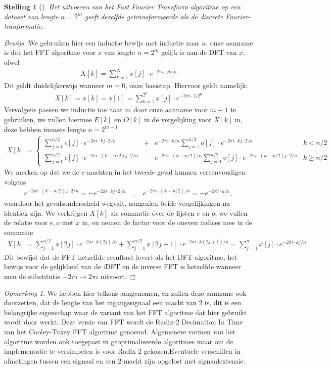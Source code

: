 \documentclass[11pt]{report}
\newcommand{\e}{\epsilon}
\newtheorem*{stelling}{Stelling}
\theoremstyle{remark}
\newtheorem*{opmerk}{Opmerking}
\newcommand{\eq}[1]{\begin{eqnarray*} #1 \end{eqnarray*}}
\begin{document}
\begin{stelling}[]
  Het uitvoeren van het Fast Fourier Transform algoritme op een dataset van lengte $n=2^m$ geeft
  dezelfde getransformeerde als de discrete Fourier-tranformatie.
\end{stelling}
\begin{proof}[Bewijs]
We gebruiken hier een inductie bewijs met inductie naar $n$, onze aanname is dat het FFT algoritme voor $x$ van lengte $n=2^m$ gelijk is aan de DFT van $x$, ofwel
\eq{
  X[k] = \sum^{N}_{k=1} x[j] \cdot e^{-2\pi i \cdot jk/n}
}
Dit geldt duidelijkerwijs wanneer $m=0$, onze basistap. Hiervoor geldt namelijk:
\eq{
  X[k] = x[k] = x[1] = \sum^{2^0}_{k=1} x[j] \cdot e^{-2\pi i \cdot 1/2^0}
}
Vervolgens passen we inductie toe naar $m$ door onze aanname voor $m-1$ te gebruiken,
we vullen hiermee $E[k]$ en $O[k]$ in de vergelijking voor $X[k]$ in, deze hebben immers lengte $n=2^{m-1}$.
\eq{
  X[k] = \left\{\begin{array}{llll}
    \sum^{n/2}_{j=1} \e[j] 
    \cdot e^{-2\pi i \cdot kj \cdot 2/n} &+& 
    e^{-2\pi i \cdot k/n}
    \sum^{n/2}_{j=1} o[j] 
    \cdot e^{-2\pi i\cdot kj \cdot 2/n} &  k< n/2 \\
    \sum^{n/2}_{j=1} \e[j] 
    \cdot e^{-2\pi i\cdot (k-n/2) j\cdot 2/n} &-& 
    e^{-2\pi i\cdot (k-n/2)/n}
    \sum^{n/2}_{j=1} o[j] \cdot e^{-2\pi i\cdot (k-n/2)j\cdot 2/n} &  k\geq n/2 
  \end{array}\right.
}
We merken op dat we de e-machten in het tweede geval kunnen vereenvoudigen volgens
\eq{
  e^{-2\pi i\cdot (k-n/2)j \cdot 2/n} 
  = - e^{-2\pi i\cdot kj\cdot 2/n} \quad,\quad e^{-2\pi i\cdot(k-n/2)/n} 
= -e^{-2\pi i\cdot k/n},
}
waardoor het gevalsonderscheid wegvalt, aangezien beide vergelijkingen nu identiek zijn.
We verkrijgen $X[k]$ als sommatie over de lijsten $e$ en $o$, we vullen de relatie voor $e,o$ met $x$ in, en nemen de factor voor de oneven indices mee in de sommatie.
\eq{
  X[k] = \sum^{n/2}_{j=1} x[2j] \cdot e^{-2\pi i\cdot k (2j)/n} + 
    \sum^{n/2}_{j=1} x[2j+1] \cdot e^{-2\pi i\cdot k (2j+1)/n} 
    = \sum^n_{j=1} x[j] \cdot e^{-2\pi i\cdot k j/n}
}
Dit bewijst dat de FFT hetzelfde resultaat levert als het DFT algoritme, het bewijs voor de gelijkheid van de iDFT en de inverse FFT is 
hetzelfde wanneer men de substitutie $-2\pi i \rightarrow 2\pi i$ uitvoert.
\end{proof}

\begin{opmerk}
We hebben hier telkens aangenomen, en zullen deze aanname ook doorzetten, 
dat de lengte van het ingangssignaal een macht van $2$ is, dit is een belangrijke
eigenschap waar de variant van het FFT algoritme dat hier gebruikt wordt door werkt. Deze versie van FFT wordt
de Radix-2 Decimation In Time van het Cooley-Tukey FFT algoritme genoemd. Algemenere vormen van het algoritme
worden ook toegepast in geoptimaliseerde algoritmes maar om de implementatie te versimpelen 
is voor Radix-2 gekozen.Eventuele verschillen in afmetingen tussen een signaal en 
een 2-macht zijn opgelost met signaalextensie.
\end{opmerk}
\end{document}
